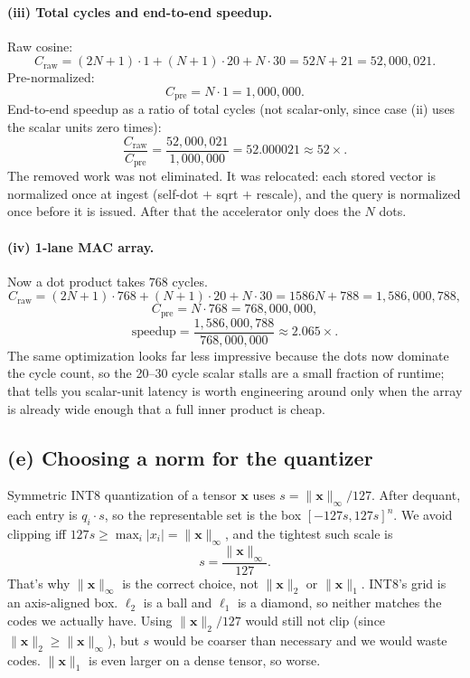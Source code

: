 \documentclass[11pt]{article}
\newcommand{\vct}[1]{\mathbf{#1}}
\begin{document}
\paragraph{(iii) Total cycles and end-to-end speedup.}
Raw cosine:
\[
C_{\mathrm{raw}}
= (2N+1)\cdot 1 + (N+1)\cdot 20 + N\cdot 30
= 52N + 21
= 52{,}000{,}021.
\]
Pre-normalized:
\[
C_{\mathrm{pre}} = N \cdot 1 = 1{,}000{,}000.
\]
End-to-end speedup as a ratio of total cycles (not scalar-only, since case
(ii) uses the scalar units zero times):
\[
\frac{C_{\mathrm{raw}}}{C_{\mathrm{pre}}}
= \frac{52{,}000{,}021}{1{,}000{,}000}
= 52.000021
\approx 52\times.
\]
The removed work was not eliminated. It was relocated: each stored vector is
normalized once at ingest (self-dot \(+\) sqrt \(+\) rescale), and the query
is normalized once before it is issued. After that the accelerator only does
the \(N\) dots.

\paragraph{(iv) 1-lane MAC array.}
Now a dot product takes \(768\) cycles.
\[
C_{\mathrm{raw}}
= (2N+1)\cdot 768 + (N+1)\cdot 20 + N\cdot 30
= 1586N + 788
= 1{,}586{,}000{,}788,
\]
\[
C_{\mathrm{pre}} = N \cdot 768 = 768{,}000{,}000,
\]
\[
\text{speedup}
= \frac{1{,}586{,}000{,}788}{768{,}000{,}000}
\approx 2.065\times.
\]
The same optimization looks far less impressive because the dots now dominate
the cycle count, so the 20--30 cycle scalar stalls are a small fraction of
runtime; that tells you scalar-unit latency is worth engineering around only
when the array is already wide enough that a full inner product is cheap.

\subsection*{(e) Choosing a norm for the quantizer}

Symmetric INT8 quantization of a tensor \(\vct{x}\) uses
\(s = \|\vct{x}\|_\infty / 127\). After dequant, each entry is \(q_i \cdot s\),
so the representable set is the box \([-127s, 127s]^n\). We avoid clipping
iff \(127s \ge \max_i |x_i| = \|\vct{x}\|_\infty\), and the tightest such
scale is
\[
s = \frac{\|\vct{x}\|_\infty}{127}.
\]
That's why \(\|\vct{x}\|_\infty\) is the correct choice, not
\(\|\vct{x}\|_2\) or \(\|\vct{x}\|_1\). INT8's grid is an axis-aligned box.
\(\ell_2\) is a ball and \(\ell_1\) is a diamond, so neither matches the
codes we actually have. Using \(\|\vct{x}\|_2/127\) would still not clip
(since \(\|\vct{x}\|_2 \ge \|\vct{x}\|_\infty\)), but \(s\) would be coarser
than necessary and we would waste codes. \(\|\vct{x}\|_1\) is even larger on
a dense tensor, so worse.
\end{document}
